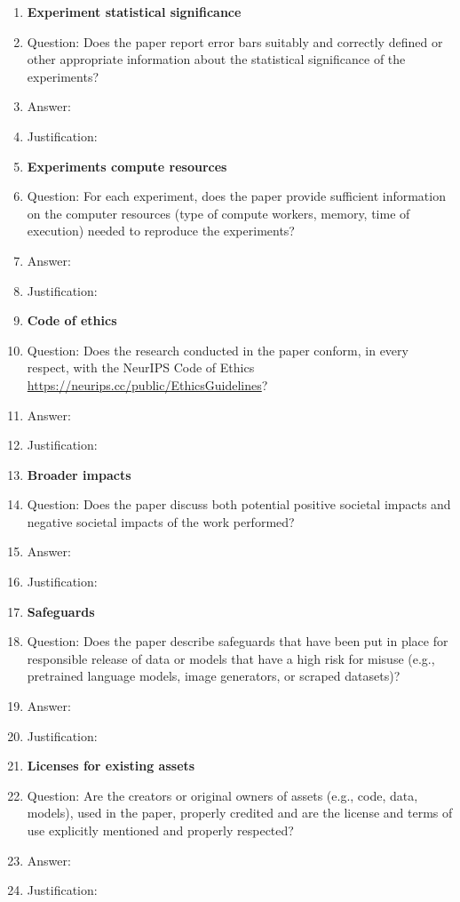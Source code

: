 \documentclass{article}
\begin{document}
\begin{enumerate}
\item {\bf Experiment statistical significance}
    \item[] Question: Does the paper report error bars suitably and correctly defined or other appropriate information about the statistical significance of the experiments?
    \item[] Answer: \answerTODO{}
    \item[] Justification: \justificationTODO{}

\item {\bf Experiments compute resources}
    \item[] Question: For each experiment, does the paper provide sufficient information on the computer resources (type of compute workers, memory, time of execution) needed to reproduce the experiments?
    \item[] Answer: \answerTODO{}
    \item[] Justification: \justificationTODO{}

\item {\bf Code of ethics}
    \item[] Question: Does the research conducted in the paper conform, in every respect, with the NeurIPS Code of Ethics \url{https://neurips.cc/public/EthicsGuidelines}?
    \item[] Answer: \answerTODO{}
    \item[] Justification: \justificationTODO{}

\item {\bf Broader impacts}
    \item[] Question: Does the paper discuss both potential positive societal impacts and negative societal impacts of the work performed?
    \item[] Answer: \answerTODO{}
    \item[] Justification: \justificationTODO{}

\item {\bf Safeguards}
    \item[] Question: Does the paper describe safeguards that have been put in place for responsible release of data or models that have a high risk for misuse (e.g., pretrained language models, image generators, or scraped datasets)?
    \item[] Answer: \answerTODO{}
    \item[] Justification: \justificationTODO{}

\item {\bf Licenses for existing assets}
    \item[] Question: Are the creators or original owners of assets (e.g., code, data, models), used in the paper, properly credited and are the license and terms of use explicitly mentioned and properly respected?
    \item[] Answer: \answerTODO{}
    \item[] Justification: \justificationTODO{}


\end{enumerate}
\end{document}

